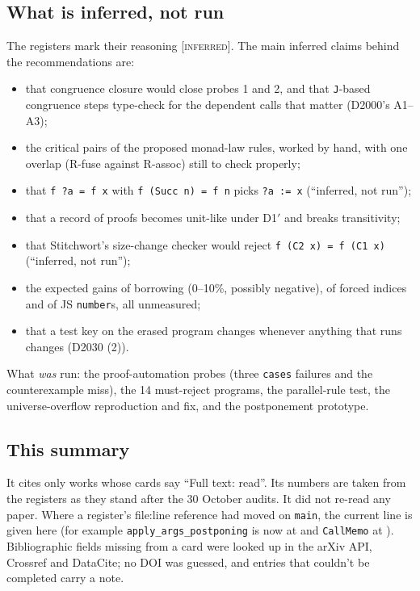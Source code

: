 \documentclass[11pt,a4paper]{article}
\newcommand{\code}[1]{\texttt{#1}}
\newcommand{\file}[1]{\path{#1}}
\newcommand{\inferred}{\textsc{[inferred]}}
\begin{document}
\subsection{What is inferred, not run}
The registers mark their reasoning \inferred. The main inferred claims behind the
recommendations are:
\begin{itemize}
  \item that congruence closure would close probes 1 and 2, and that \code{J}-based congruence
        steps type-check for the dependent calls that matter (D2000's A1--A3);
  \item the critical pairs of the proposed monad-law rules, worked by hand, with one overlap
        (R-fuse against R-assoc) still to check properly;
  \item that \code{f ?a = f x} with \code{f (Succ n) = f n} picks \code{?a := x} (``inferred, not
        run'');
  \item that a record of proofs becomes unit-like under D1$'$ and breaks transitivity;
  \item that Stitchwort's size-change checker would reject \code{f (C2 x) = f (C1 x)}
        (``inferred, not run'');
  \item the expected gains of borrowing (0--10\%, possibly negative), of forced indices and of
        JS \code{number}s, all unmeasured;
  \item that a test key on the erased program changes whenever anything that runs changes
        (D2030 (2)).
\end{itemize}
What \emph{was} run: the proof-automation probes (three \code{cases} failures and the
counterexample miss), the 14 must-reject programs, the parallel-rule test, the universe-overflow
reproduction and fix, and the postponement prototype.

\subsection{This summary}
It cites only works whose cards say ``Full text: read''. Its numbers are taken from the
registers as they stand after the 30 October audits. It did not re-read any paper. Where a
register's file:line reference had moved on \code{main}, the current line is given here (for
example \code{apply\_args\_postponing} is now at \file{check.rs:1903} and \code{CallMemo} at
\file{value.rs:2334}). Bibliographic fields missing from a card were looked up in the arXiv API,
Crossref and DataCite; no DOI was guessed, and entries that couldn't be completed carry a note.

{}
\printbibliography[title={References}]
\end{document}
